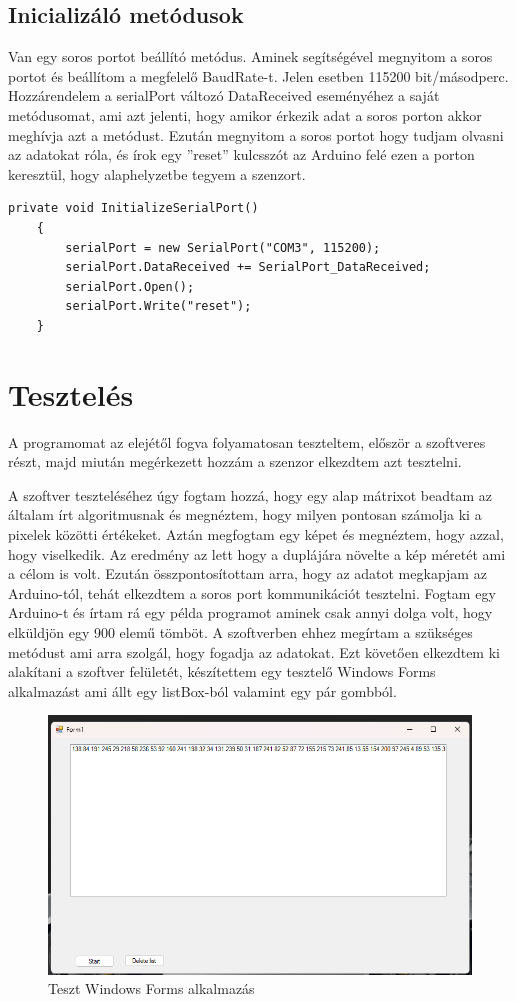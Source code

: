 \documentclass[]{thesis-ekf}
\theoremstyle{definition}
\theoremstyle{remark}
\begin{document}
\section{Inicializáló metódusok}
Van egy soros portot beállító metódus. Aminek segítségével megnyitom a soros portot és beállítom a megfelelő BaudRate-t. Jelen esetben 115200 bit/másodperc. Hozzárendelem a serialPort változó DataReceived eseményéhez a saját metódusomat, ami azt jelenti, hogy amikor érkezik adat a soros porton akkor meghívja azt a metódust. Ezután megnyitom a soros portot hogy tudjam olvasni az adatokat róla, és írok egy ''reset'' kulcsszót az Arduino felé ezen a porton keresztül, hogy alaphelyzetbe tegyem a szenzort.
\begin{lstlisting}[language=CSharp]
	private void InitializeSerialPort()
	{
		serialPort = new SerialPort("COM3", 115200);
		serialPort.DataReceived += SerialPort_DataReceived;
		serialPort.Open();
		serialPort.Write("reset");
	}
\end{lstlisting}

\chapter{Tesztelés}
A programomat az elejétől fogva folyamatosan teszteltem, először a szoftveres részt, majd miután megérkezett hozzám a szenzor elkezdtem azt tesztelni. 

A szoftver teszteléséhez úgy fogtam hozzá, hogy egy alap mátrixot beadtam az általam írt algoritmusnak és megnéztem, hogy milyen pontosan számolja ki a pixelek közötti értékeket. Aztán megfogtam egy képet és megnéztem, hogy azzal, hogy viselkedik. Az eredmény az lett hogy a duplájára növelte a kép méretét ami a célom is volt. Ezután összpontosítottam arra, hogy az adatot megkapjam az Arduino-tól, tehát elkezdtem a soros port kommunikációt tesztelni. Fogtam egy Arduino-t és írtam rá egy példa programot aminek csak annyi dolga volt, hogy elküldjön egy 900 elemű tömböt. A szoftverben ehhez megírtam a szükséges metódust ami arra szolgál, hogy fogadja az adatokat. Ezt követően elkezdtem ki alakítani a szoftver felületét, készítettem egy tesztelő Windows Forms alkalmazást ami állt egy listBox-ból valamint egy pár gombból.

\begin{figure}[th!]
	\centering
	\includegraphics[width=0.7\linewidth]{tesztalkalmazas}
	\caption[Teszt alkalmazás]{Teszt Windows Forms alkalmazás}
	\label{fig:tesztalkalmazas}
\end{figure}
\end{document}
